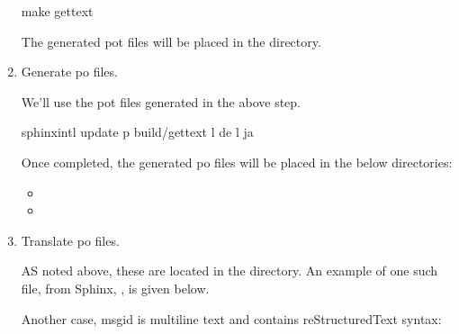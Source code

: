 \documentclass[letterpaper,10pt,english]{sphinxmanual}
\begin{document}
\begin{enumerate}
\begin{sphinxVerbatim}[commandchars=\\\{\}]
 make gettext
\end{sphinxVerbatim}

The generated pot files will be placed in the  directory.

\item {} 
Generate po files.

We’ll use the pot files generated in the above step.

\begin{sphinxVerbatim}[commandchars=\\\{\}]
 sphinx\PYGZhy{}intl update \PYGZhy{}p \PYGZus{}build/gettext \PYGZhy{}l de \PYGZhy{}l ja
\end{sphinxVerbatim}

Once completed, the generated po files will be placed in the below
directories:
\begin{itemize}
\item {} 

\item {} 

\end{itemize}

\item {} 
Translate po files.

AS noted above, these are located in the 
directory.  An example of one such file, from Sphinx, , is
given below.

\begin{sphinxVerbatim}[commandchars=\\\{\}]
 
 
\end{sphinxVerbatim}

Another case, msgid is multi\sphinxhyphen{}line text and contains reStructuredText syntax:

\begin{sphinxVerbatim}[commandchars=\\\{\}]
 
 
\end{sphinxVerbatim}


\end{enumerate}
\end{document}
